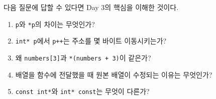 \documentclass[11pt,a4paper]{article}
\begin{document}
\begin{checkpointbox}
다음 질문에 답할 수 있다면 Day 3의 핵심을 이해한 것이다.
\begin{enumerate}[leftmargin=1.5em]
    \item \texttt{p}와 \texttt{*p}의 차이는 무엇인가?
    \item \texttt{int* p}에서 \texttt{p++}는 주소를 몇 바이트 이동시키는가?
    \item 왜 \texttt{numbers[3]}과 \texttt{*(numbers + 3)}이 같은가?
    \item 배열을 함수에 전달했을 때 원본 배열이 수정되는 이유는 무엇인가?
    \item \texttt{const int*}와 \texttt{int* const}는 무엇이 다른가?
\end{enumerate}
\end{checkpointbox}
\end{document}
